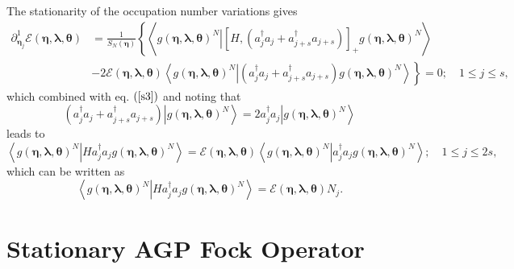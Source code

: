 \documentclass[aps,preprint]{revtex4}%
\begin{document}
The stationarity of the occupation number variations gives
\begin{align}
\partial_{\bm{\eta}_{j}}^{1}\mathcal{E}\left(
\bm{\eta},\bm{\lambda},\bm{\theta}\right)   &  =\frac{1}{S_{N}\left(
\bm{\eta}\right)  }\left\{  \left\langle \left.  g\left(
\bm{\eta },\bm{\lambda},\bm{\theta}\right)  ^{N}\right\vert \left[  H,\left(
a_{j}^{\dagger}a_{j}+a_{j+s}^{\dagger}a_{j+s}\right)  \right]  _{+}g\left(
\bm{\eta},\bm{\lambda},\bm{\theta}\right)  ^{N}\right\rangle \right.
\nonumber\\
&  -\left.  2\mathcal{E}\left(  \bm{\eta},\bm{\lambda},\bm{\theta }\right)
\left\langle \left.  g\left(  \bm{\eta},\bm{\lambda },\bm{\theta}\right)
^{N}\right\vert \left(  a_{j}^{\dagger}a_{j}+a_{j+s}^{\dagger}a_{j+s}\right)
g\left(  \bm{\eta},\bm{\lambda },\bm{\theta}\right)  ^{N}\right\rangle
\right\}  =0;\quad1\leq j\leq s,
\end{align}
which combined with eq. $\left(  \ref{s3}\right)  $ and noting that
\begin{equation}
\left(  a_{j}^{\dagger}a_{j}+a_{j+s}^{\dagger}a_{j+s}\right)  \left\vert
g\left(  \bm{\eta},\bm{\lambda},\bm{\theta}\right)  ^{N}\right\rangle
=2a_{j}^{\dagger}a_{j}\left\vert g\left(
\bm{\eta },\bm{\lambda},\bm{\theta}\right)  ^{N}\right\rangle
\end{equation}
leads to
\begin{equation}
\left\langle \left.  g\left(  \bm{\eta},\bm{\lambda},\bm{\theta }\right)
^{N}\right\vert Ha_{j}^{\dagger}a_{j}g\left(
\bm{\eta },\bm{\lambda},\bm{\theta}\right)  ^{N}\right\rangle =\mathcal{E}%
\left(  \bm{\eta},\bm{\lambda},\bm{\theta}\right)  \left\langle \left.
g\left(  \bm{\eta},\bm{\lambda},\bm{\theta}\right)  ^{N}\right\vert
a_{j}^{\dagger}a_{j}g\left(  \bm{\eta},\bm{\lambda },\bm{\theta}\right)
^{N}\right\rangle ;\quad1\leq j\leq2s,
\end{equation}
which can be written as
\begin{equation}
\left\langle \left.  g\left(  \bm{\eta},\bm{\lambda},\bm{\theta }\right)
^{N}\right\vert Ha_{j}^{\dagger}a_{j}g\left(
\bm{\eta },\bm{\lambda},\bm{\theta}\right)  ^{N}\right\rangle =\mathcal{E}%
\left(  \bm{\eta},\bm{\lambda},\bm{\theta}\right)  N_{j}.
\end{equation}


\section{Stationary AGP Fock Operator\label{AGPFock}}
\end{document}
